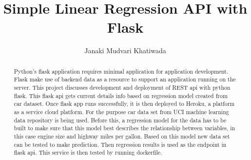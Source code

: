 
\def\paperstatus{100} %
\def\paperchapter{REST} %
\def\hid{hid-sp18-415} %
\def\volume{9} %

\def\locator{\hid, Volume: \volume, Chapter: \paperchapter, Status: \paperstatus. \newline}

\title{Simple Linear Regression API with Flask}



\author{Janaki Mudvari Khatiwada}


\renewcommand{\shortauthors}{J. M. Khatiwada}



\begin{abstract}
  Python's flask application requires minimal application for application
  development. Flask make use of backend data as a resource to support an
  application running on the server. This project discusses development
  and deployment of REST api with python flask. This flask api gets current
  details
  info based on regression model created from car dataset. Once flask app runs 
  successfully, it is then deployed to Heroku, a platform as a service 
  cloud platform. For the purpose car data set from UCI machine learning
  data repository is being used. Before this, a regression model for the
  data has to be built to make sure that this model best describes the 
  relationship between variables, in this case engine size and highway
  miles per gallon. Based on this model new data set can be tested to make 
  prediction. Then regression results is used as the endpoint 
  in flask api. This service is then tested by running dockerfile.
   
\end{abstract}

